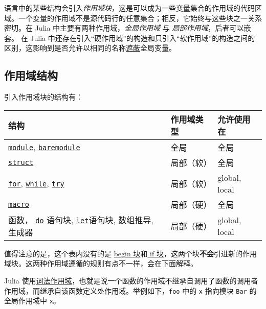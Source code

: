 语言中的某些结构会引入\emph{作用域块}，这是可以成为一些变量集合的作用域的代码区域。一个变量的作用域不是源代码行的任意集合；相反，它始终与这些块之一关系密切。在 Julia 中主要有两种作用域，\emph{全局作用域} 与 \emph{局部作用域}，后者可以嵌套。 在 Julia 中还存在引入“硬作用域”的构造和只引入“软作用域”的构造之间的区别，这影响到是否允许以相同的名称\href{https://en.wikipedia.org/wiki/Variable\_shadowing}{遮蔽}全局变量。



\hypertarget{10787034693073583413}{}


\subsection{作用域结构}



引入作用域块的结构有：




\begin{table}[h]

\begin{tabulary}{\linewidth}{|L|L|L|}
\hline
结构 & 作用域类型 & 允许使用在 \\
\hline
\hyperlink{16285380181904025577}{\texttt{module}}, \hyperlink{13329108222158426840}{\texttt{baremodule}} & 全局 & 全局 \\
\hline
\hyperlink{4119979838407461137}{\texttt{struct}} & 局部（软） & 全局 \\
\hline
\hyperlink{9105224580875818383}{\texttt{for}}, \hyperlink{15133348314455964692}{\texttt{while}}, \hyperlink{16338536928035025961}{\texttt{try}} & 局部（软） & global, local \\
\hline
\hyperlink{4625593635027008869}{\texttt{macro}} & 局部（硬） & 全局 \\
\hline
函数， \hyperlink{16455129305818705265}{\texttt{do}} 语句块, \hyperlink{4956741936243461891}{\texttt{let}}语句块, 数组推导, 生成器 & 局部（硬） & global, local \\
\hline
\end{tabulary}

\end{table}



值得注意的是，这个表内没有的是 \hyperlink{14178955634857450370}{begin 块}和\hyperlink{14451148373001501733}{ if 块}，这两个块\textbf{不会}引进新的作用域块。这两种作用域遵循的规则有点不一样，会在下面解释。



Julia 使用\href{https://en.wikipedia.org/wiki/Scope\_\%28computer\_science\%29\#Lexical\_scoping\_vs.\_dynamic\_scoping}{词法作用域}，也就是说一个函数的作用域不继承自调用了函数的调用者作用域，而继承自该函数定义处作用域。举例如下，\texttt{foo} 中的 \texttt{x} 指向模块 \texttt{Bar} 的全局作用域中 \texttt{x}。




